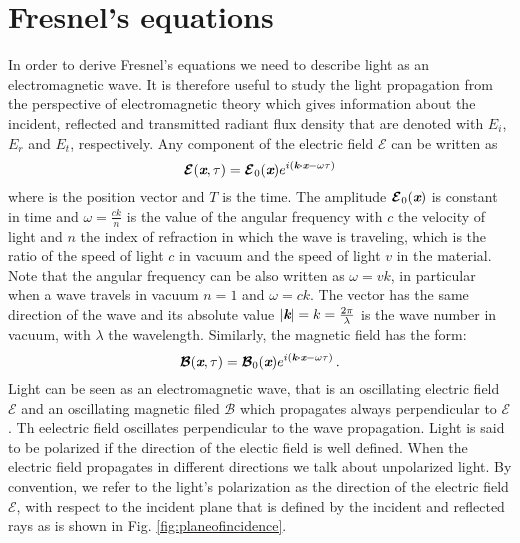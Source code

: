 \section{Fresnel's equations}\label{sec:fresnel}
In order to derive Fresnel's equations we need to describe light as an electromagnetic wave. 
It is therefore useful to study the light propagation from the perspective of electromagnetic theory which gives information about the incident, reflected and transmitted radiant flux density that are denoted with $E_i$, $E_r$ and $E_t$, respectively.  
Any component of the electric field $\boldsymbol{\mathcal{E}}$ can be written as
\begin{equation}\label{electric_field}
\boldsymbol{\mathcal{E}}(\textit{\textbf{x}}, \tau) = \boldsymbol{\mathcal{E}}_0(\textit{\textbf{x}} )e^{i( \textit{\textbf{k}}\boldsymbol{\cdot}\textit{\textbf{x}}-\omega \tau )}
\end{equation}
where  is the position vector and $T$ is the time. The amplitude $\boldsymbol{\mathcal{E}}_0(\textit{\textbf{x}})$ is constant in time and $\omega = \frac{c k}{n}$ is the value of the angular frequency with $c$ the velocity of light and $n$ the index of refraction in which the wave is traveling, which is the ratio of the speed of light $c$ in vacuum and the speed of light $v$ in the material. Note that the angular frequency can be also written as $\omega = vk$, in particular when a wave travels in vacuum $n=1$ and $\omega=ck$. The vector  has the same direction of the wave and its absolute value 
$|\textit{\textbf{k}}| = k = \frac{2\pi}{\lambda}$ is the wave number in vacuum, with $\lambda$ the wavelength. Similarly, the magnetic field has the form:
\begin{equation}
\boldsymbol{\mathcal{B}}(\textit{\textbf{x}}, \tau) = \boldsymbol{\mathcal{B}}_0(\textit{\textbf{x}}) e^{i( \textit{\textbf{k}}\boldsymbol{\cdot} \textit{\textbf{x}}-\omega \tau )}\,.
\end{equation}
Light can be seen as an electromagnetic wave, that is an oscillating electric field $\boldsymbol{\mathcal{E}}$ and an oscillating magnetic filed $\boldsymbol{\mathcal{B}}$ which propagates  always perpendicular to $\boldsymbol{\mathcal{E}}$. Th eelectric field oscillates perpendicular to the wave propagation.
Light is said to be polarized if the direction of the electic field is well defined. When the electric field propagates in different directions we talk about unpolarized light. 
By convention, we refer to the light's polarization as the direction of the electric field $\boldsymbol{\mathcal{E}}$, \cite{feynman1964feynman} with respect to the incident plane that is defined by the incident and reflected rays as is shown in Fig. \ref{fig:planeofincidence}. 
